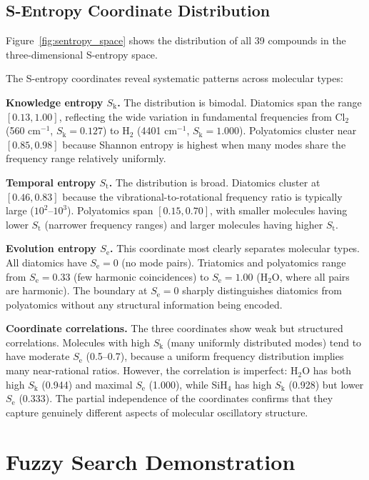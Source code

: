 \documentclass[11pt,twocolumn,a4paper]{article}
\theoremstyle{definition}
\theoremstyle{remark}
\newcommand{\Sk}{S_{\mathrm{k}}}
\newcommand{\St}{S_{\mathrm{t}}}
\newcommand{\Se}{S_{\mathrm{e}}}
\begin{document}
\subsection{S-Entropy Coordinate Distribution}

Figure~\ref{fig:sentropy_space} shows the distribution of all 39 compounds in the three-dimensional S-entropy space.



The S-entropy coordinates reveal systematic patterns across molecular types:

\textbf{Knowledge entropy $\Sk$.} The distribution is bimodal. Diatomics span the range $[0.13, 1.00]$, reflecting the wide variation in fundamental frequencies from Cl$_2$ (560 cm$^{-1}$, $\Sk = 0.127$) to H$_2$ (4401 cm$^{-1}$, $\Sk = 1.000$). Polyatomics cluster near $[0.85, 0.98]$ because Shannon entropy is highest when many modes share the frequency range relatively uniformly.

\textbf{Temporal entropy $\St$.} The distribution is broad. Diatomics cluster at $[0.46, 0.83]$ because the vibrational-to-rotational frequency ratio is typically large ($10^2$--$10^3$). Polyatomics span $[0.15, 0.70]$, with smaller molecules having lower $\St$ (narrower frequency ranges) and larger molecules having higher $\St$.

\textbf{Evolution entropy $\Se$.} This coordinate most clearly separates molecular types. All diatomics have $\Se = 0$ (no mode pairs). Triatomics and polyatomics range from $\Se = 0.33$ (few harmonic coincidences) to $\Se = 1.00$ (H$_2$O, where all pairs are harmonic). The boundary at $\Se = 0$ sharply distinguishes diatomics from polyatomics without any structural information being encoded.

\textbf{Coordinate correlations.} The three coordinates show weak but structured correlations. Molecules with high $\Sk$ (many uniformly distributed modes) tend to have moderate $\Se$ (0.5--0.7), because a uniform frequency distribution implies many near-rational ratios. However, the correlation is imperfect: H$_2$O has both high $\Sk$ (0.944) and maximal $\Se$ (1.000), while SiH$_4$ has high $\Sk$ (0.928) but lower $\Se$ (0.333). The partial independence of the coordinates confirms that they capture genuinely different aspects of molecular oscillatory structure.

\section{Fuzzy Search Demonstration}
\label{sec:fuzzy_demo}
\end{document}

